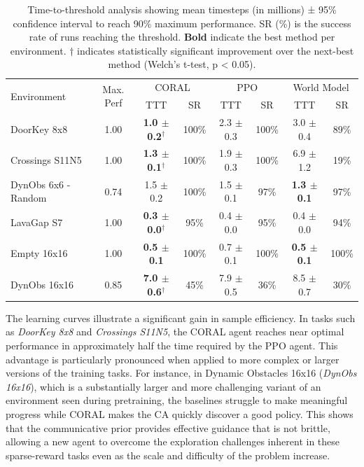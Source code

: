 \documentclass[letterpaper]{article} %
\begin{document}
\begin{table}[bt]
\vspace{-5pt}
\centering
  \begin{tabular}{l c cc cc cc}
    \toprule
    \multirow{2}{*}{Environment} &
    \multirow{2}{*}{Max. Perf} &
    \multicolumn{2}{c}{\textcolor[HTML]{923BE5}{CORAL}} &
    \multicolumn{2}{c}{\textcolor[HTML]{339332}{PPO}} &
    \multicolumn{2}{c}{\textcolor[HTML]{DD264A}{World Model}} \\
      & & TTT & SR & TTT & SR & TTT & SR \\
    \midrule
DoorKey 8x8 & 1.00 & \textbf{1.0 $\pm$ 0.2$^{\dag}$} & 100\% & 2.3 $\pm$ 0.3 & 100\% & 3.0 $\pm$ 0.4 & 89\% \\
Crossings S11N5 & 1.00 & \textbf{1.3 $\pm$ 0.1$^{\dag}$} & 100\% & 1.9 $\pm$ 0.3 & 100\% & 6.9 $\pm$ 1.2 & 19\% \\
DynObs 6x6 - Random & 0.74 & 1.5 $\pm$ 0.2 & 100\% & 1.5 $\pm$ 0.1 & 97\% & \textbf{1.3 $\pm$ 0.1} & 97\% \\
LavaGap S7 & 1.00 & \textbf{0.3 $\pm$ 0.0$^{\dag}$} & 95\% & 0.4 $\pm$ 0.0 & 95\% & 0.4 $\pm$ 0.0 & 94\% \\
Empty 16x16 & 1.00 & \textbf{0.5 $\pm$ 0.1} & 100\% & 0.7 $\pm$ 0.1 & 100\% & \textbf{0.5 $\pm$ 0.1} & 100\% \\
DynObs 16x16 & 0.85 & \textbf{7.0 $\pm$ 0.6$^{\dag}$} & 45\% & 7.9 $\pm$ 0.5 & 36\% & 8.5 $\pm$ 0.7 & 30\% \\
    \bottomrule
  \end{tabular}
\vspace{-5pt}
\caption{Time-to-threshold analysis showing mean timesteps (in millions) ± 95\% confidence interval to reach 90\% maximum performance. SR (\%) is the success rate of runs reaching the threshold. \textbf{Bold} indicate the best method per environment. ${\dag}$ indicates statistically significant improvement over the next-best method (Welch’s t-test, p < 0.05).}
\label{table: TTT}
\vspace{-5pt}
\end{table}

The learning curves illustrate a significant gain in sample efficiency. In tasks such as \textit{DoorKey 8x8} and \textit{Crossings S11N5}, the CORAL agent reaches near optimal performance in approximately half the time required by the PPO agent. This advantage is particularly pronounced when applied to more complex or larger versions of the training tasks. For instance, in Dynamic Obstacles 16x16 (\textit{DynObs 16x16}), which is a substantially larger and more challenging variant of an environment seen during pretraining, the baselines struggle to make meaningful progress while CORAL makes the CA quickly discover a good policy. This shows that the communicative prior provides effective guidance that is not brittle, allowing a new agent to overcome the exploration challenges inherent in these sparse-reward tasks even as the scale and difficulty of the problem increase.
\end{document}
